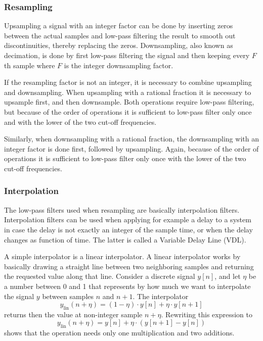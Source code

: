 \subsubsection{Resampling}
Upsampling a signal with an integer factor can be done by inserting zeros
between the actual samples and low-pass filtering the result to smooth out
discontinuities, thereby replacing the zeros. Downsampling, also known as
decimation, is done by first low-pass filtering the signal and then keeping
every $F$th sample where $F$ is the integer downsampling factor.

If the resampling factor is not an integer, it is necessary to combine
upsampling and downsampling. When upsampling with a rational fraction it is
necessary to upsample first, and then downsample. Both operations require
low-pass filtering, but because of the order of operations it is sufficient to
low-pass filter only once and with the lower of the two cut-off frequencies.

Similarly, when downsampling with a rational fraction, the downsampling with an
integer factor is done first, followed by upsampling. Again, because of the
order of operations it is sufficient to low-pass filter only once with the lower
of the two cut-off frequencies.

\subsubsection{Interpolation} %
The low-pass filters used when resampling are basically interpolation filters.
Interpolation filters can be used when applying for example a delay to a system in case
the delay is not exactly an integer of the sample time, or when the delay
changes as function of time. The latter is called a Variable Delay Line (VDL).

A simple interpolator is a linear interpolator. A linear interpolator works by
basically drawing a straight line between two neighboring samples and returning
the requested value along that line. Consider a discrete signal $y[n]$, and let
$\eta$ be a number between 0 and 1 that represents by how much we want to
interpolate the signal $y$ between samples $n$ and $n+1$. The interpolator
\begin{equation}
  y_{\mathrm{lin}} (n + \eta) = (1-\eta) \cdot y[n] + \eta \cdot y[n+1]
\end{equation}
returns then the value at non-integer sample $n+\eta$. Rewriting this expression to
\begin{equation}\label{eq:theory:signal:resampling:interpolation-linear}
  y_{\mathrm{lin}} (n + \eta) = y[n] + \eta \cdot \left( y[n+1] - y[n] \right)
\end{equation}
shows that the operation needs only one multiplication and two additions.

